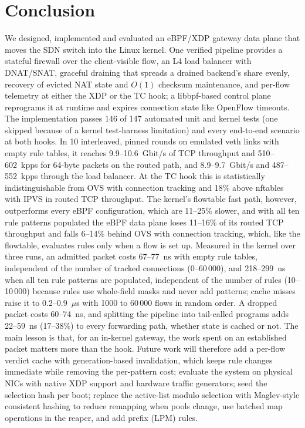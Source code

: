 \documentclass[conference]{IEEEtran}
\begin{document}
\section{Conclusion}
We designed, implemented and evaluated an eBPF/XDP gateway data plane that
moves the SDN switch into the Linux kernel. One verified pipeline provides a
stateful firewall over the client-visible flow, an L4 load balancer with
DNAT/SNAT, graceful draining that spreads a drained backend's share evenly,
recovery of evicted NAT state and $O(1)$ checksum maintenance, and per-flow
telemetry at either the XDP or the TC hook; a libbpf-based control plane
reprograms it at runtime and expires connection state like OpenFlow
timeouts. The implementation passes 146 of 147 automated unit and kernel
tests (one skipped because of a kernel test-harness limitation) and every
end-to-end scenario at both hooks. In 10 interleaved, pinned rounds on
emulated veth links with empty rule tables, it reaches 9.9--10.6~Gbit/s of
TCP throughput and 510--602~kpps for 64-byte packets on the routed path, and
8.9--9.7~Gbit/s and 487--552~kpps through the load balancer. At the TC hook
this is statistically indistinguishable from OVS with connection tracking
and 18\% above nftables with IPVS in routed TCP throughput. The kernel's
flowtable fast path, however, outperforms every eBPF configuration, which
are 11--25\% slower, and with all ten rule patterns populated the eBPF data plane
loses 11--16\% of its routed TCP throughput and falls 6--14\% behind OVS with
connection tracking, which, like the flowtable, evaluates rules only when a
flow is set up. Measured in the kernel over three runs, an admitted packet
costs 67--77~ns with empty rule tables, independent of the number of tracked
connections (0--60\,000), and 218--299~ns when all ten rule patterns are
populated, independent of the number of rules (10--10\,000) because rules use
whole-field masks and never add patterns; cache misses raise it to
0.2--0.9~$\mu$s with 1000 to 60\,000 flows in random order. A dropped packet
costs 60--74~ns, and splitting the pipeline into tail-called programs adds
22--59~ns (17--38\%) to every forwarding path, whether state is cached or
not. The main lesson is that, for an in-kernel
gateway, the work spent on an established packet matters more than the hook.
Future work will therefore add a per-flow verdict cache with generation-based
invalidation, which keeps rule changes immediate while removing the
per-pattern cost; evaluate the system on physical NICs with native XDP support
and hardware traffic generators; seed the selection hash per boot; replace
the active-list modulo selection with Maglev-style
consistent hashing \cite{eisenbud2016maglev} to reduce remapping when pools
change, use batched map operations in the reaper, and add prefix (LPM) rules.
\end{document}
